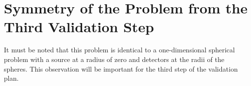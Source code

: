 \chapter{Symmetry of the Problem from the Third Validation Step}
\label{ch:appendix_D}
It must be noted that this problem is identical to a one-dimensional spherical
problem with a source at a radius of zero and detectors at the radii of the
spheres. This observation will be important for the third step of the validation
plan. 
